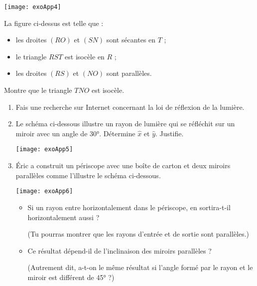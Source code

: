 \begin{exercice}

\begin{center}
    \texttt{[image: exoApp4]}
\end{center}

La figure ci-dessus est telle que :
\begin{itemize}
    \item les droites $(RO)$ et $(SN)$ sont sécantes en $T$ ;
    \item le triangle $RST$ est isocèle en $R$ ;
    \item les droites $(RS)$ et $(NO)$ sont parallèles.
\end{itemize}

Montre que le triangle $TNO$ est isocèle.
\end{exercice}




\begin{exercice}

\begin{enumerate}
\item Fais une recherche sur Internet concernant la loi de réflexion de la lumière.
\item Le schéma ci-dessous illustre un rayon de lumière qui se réfléchit sur un miroir avec un angle de 30°. Détermine $\hat{x}$ et $\hat{y}$. Justifie.

\begin{center}
    \texttt{[image: exoApp5]}
\end{center}

\item Éric a construit un périscope avec une boîte de carton et deux miroirs parallèles comme l'illustre le schéma ci-dessous.

\begin{center}
    \texttt{[image: exoApp6]}
\end{center}

\begin{itemize}
    \item Si un rayon entre horizontalement dans le périscope, en sortira-t-il horizontalement aussi ?
    
    (Tu pourras montrer que les rayons d'entrée et de sortie sont parallèles.)
    \item Ce résultat dépend-il de l'inclinaison des miroirs parallèles ?
    
    (Autrement dit, a-t-on le même résultat si l'angle formé par le rayon et le miroir est différent de 45° ?)
\end{itemize}
\end{enumerate}
\end{exercice}
